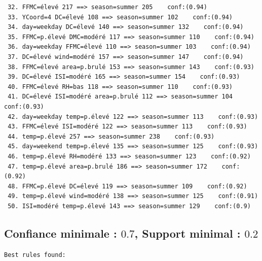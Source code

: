 \documentclass{article}
\begin{document}
\begin{sffamily}
\begin{center}
\begin{verbatim}
 32. FFMC=élevé 217 ==> season=summer 205    conf:(0.94)
 33. YCoord=4 DC=élevé 108 ==> season=summer 102    conf:(0.94)
 34. day=weekday DC=élevé 140 ==> season=summer 132    conf:(0.94)
 35. FFMC=p.élevé DMC=modéré 117 ==> season=summer 110    conf:(0.94)
 36. day=weekday FFMC=élevé 110 ==> season=summer 103    conf:(0.94)
 37. DC=élevé wind=modéré 157 ==> season=summer 147    conf:(0.94)
 38. FFMC=élevé area=p.brulé 153 ==> season=summer 143    conf:(0.93)
 39. DC=élevé ISI=modéré 165 ==> season=summer 154    conf:(0.93)
 40. FFMC=élevé RH=bas 118 ==> season=summer 110    conf:(0.93)
 41. DC=élevé ISI=modéré area=p.brulé 112 ==> season=summer 104    conf:(0.93)
 42. day=weekday temp=p.élevé 122 ==> season=summer 113    conf:(0.93)
 43. FFMC=élevé ISI=modéré 122 ==> season=summer 113    conf:(0.93)
 44. temp=p.élevé 257 ==> season=summer 238    conf:(0.93)
 45. day=weekend temp=p.élevé 135 ==> season=summer 125    conf:(0.93)
 46. temp=p.élevé RH=modéré 133 ==> season=summer 123    conf:(0.92)
 47. temp=p.élevé area=p.brulé 186 ==> season=summer 172    conf:(0.92)
 48. FFMC=p.élevé DC=élevé 119 ==> season=summer 109    conf:(0.92)
 49. temp=p.élevé wind=modéré 138 ==> season=summer 125    conf:(0.91)
 50. ISI=modéré temp=p.élevé 143 ==> season=summer 129    conf:(0.9)	
	\end{verbatim}
\end{center}

\subsection{Confiance minimale : $0.7$, Support minimal : $0.2$} \label{annexB}

\begin{center}
	\begin{verbatim}
Best rules found:


\end{verbatim}
\end{center}
\end{sffamily}
\end{document}
